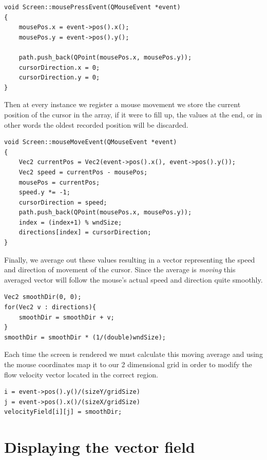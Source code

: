 \documentclass[12pt, titlepage]{article}
\begin{document}
\bigskip

\begin{lstlisting}
void Screen::mousePressEvent(QMouseEvent *event)
{
    mousePos.x = event->pos().x();
    mousePos.y = event->pos().y();

    path.push_back(QPoint(mousePos.x, mousePos.y));
    cursorDirection.x = 0;
    cursorDirection.y = 0;
}
\end{lstlisting}

\bigskip

Then at every instance we register a mouse movement we store the current position of the cursor in the array, if it were to fill up, the values at the end, or in other words the oldest recorded position will be discarded.

\begin{lstlisting}
void Screen::mouseMoveEvent(QMouseEvent *event)
{
    Vec2 currentPos = Vec2(event->pos().x(), event->pos().y());
    Vec2 speed = currentPos - mousePos;
    mousePos = currentPos;
    speed.y *= -1;
    cursorDirection = speed;
    path.push_back(QPoint(mousePos.x, mousePos.y));
    index = (index+1) % wndSize;
    directions[index] = cursorDirection;
}
\end{lstlisting}

\bigskip

Finally, we average out these values resulting in a vector representing the speed and direction of movement of the cursor. Since the average is \textit{moving} this averaged vector will follow the mouse's actual speed and direction quite smoothly.

\begin{lstlisting}
Vec2 smoothDir(0, 0);
for(Vec2 v : directions){
    smoothDir = smoothDir + v;
}
smoothDir = smoothDir * (1/(double)wndSize);
\end{lstlisting}

\bigskip

Each time the screen is rendered we must calculate this moving average and using the mouse coordinates map it to our 2 dimensional grid in order to modify the flow velocity vector located in the correct region.

\begin{lstlisting}
i = event->pos().y()/(sizeY/gridSize)
j = event->pos().x()/(sizeX/gridSize)
velocityField[i][j] = smoothDir;
\end{lstlisting}

\section{Displaying the vector field}
\end{document}
